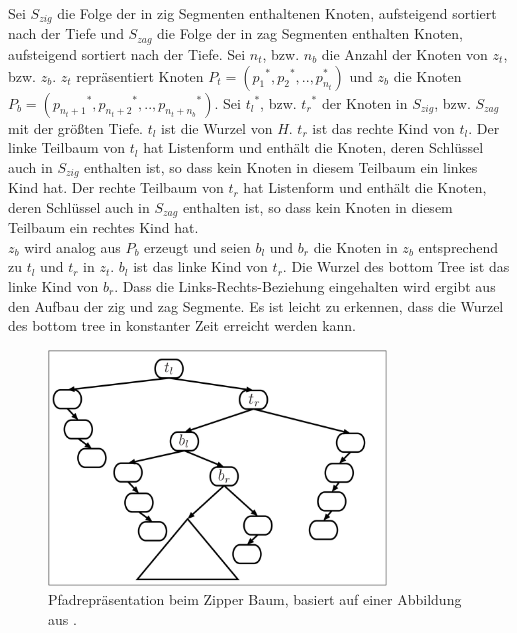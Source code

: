 \documentclass[a4paper,12pt]{article}
\begin{document}
Sei $S_{zig}$ die Folge der in zig Segmenten enthaltenen Knoten, aufsteigend sortiert nach der Tiefe und $S_{zag}$ die Folge der in zag Segmenten enthalten Knoten, aufsteigend sortiert nach der Tiefe.  Sei $n_t$, bzw. $n_b$ die Anzahl der Knoten von $z_t$, bzw. $z_b$. $z_t$ repräsentiert Knoten  $P_t = \left({p_1}^*,{p_2}^*,..,p_{n_t}^*\right)$ und $z_b$ die Knoten  $P_b = \left({p_{n_t + 1}}^*,{p_{n_t + 2}}^*,..,{p_{n_t + n_b}}^*\right)$.
Sei ${t_l}^*$, bzw. ${t_r}^*$ der Knoten in $S_{zig}$, bzw. $S_{zag}$ mit der größten Tiefe. $t_l$ ist die Wurzel von $H$. $t_r$ ist das rechte Kind von $t_l$. Der linke Teilbaum von $t_l$  hat Listenform und  enthält die  Knoten, deren Schlüssel auch in  $S_{zig}$ enthalten ist, so dass kein Knoten in diesem Teilbaum ein linkes Kind hat. Der rechte Teilbaum von $t_r$  hat Listenform und  enthält die  Knoten, deren Schlüssel auch in $S_{zag}$ enthalten ist, so dass kein Knoten in diesem Teilbaum ein rechtes Kind hat. \\
$z_b$ wird analog aus $P_b$ erzeugt und seien $b_l$ und $b_r$ die Knoten in $z_b$ entsprechend zu $t_l$ und $t_r$ in $z_t$. $b_l$ ist das linke Kind von $t_r$. Die Wurzel des bottom Tree ist das linke Kind von $b_r$. Dass die Links-Rechts-Beziehung eingehalten wird ergibt aus den Aufbau der zig und zag Segmente. Es ist leicht zu erkennen, dass die Wurzel des bottom tree in konstanter Zeit erreicht werden kann.
\begin{figure}[H]
	\includegraphics[width= 0.8\textwidth]{"Medien/Zipper/zipperPathRep"}
	\caption{Pfadrepräsentation beim Zipper Baum, basiert auf einer Abbildung aus \cite{zipper}. }
	\label{fig:zipperPathRep}
\end{figure}
\end{document}
